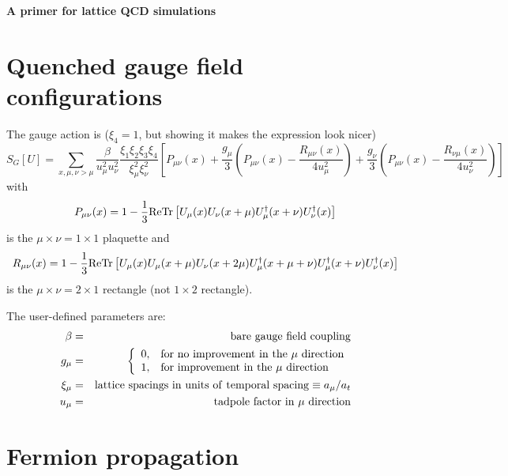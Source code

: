 \documentclass[12pt]{article}
\begin{document}
\begin{center}
{\bf A primer for lattice QCD simulations}
\end{center}

\section{Quenched gauge field configurations}

The gauge action is ($\xi_4=1$, but showing it makes the expression look nicer)
\[
S_G[U] = \sum_{x,\mu,\nu>\mu}\frac{\beta}{u_\mu^2u_\nu^2}
         \frac{\xi_1\xi_2\xi_3\xi_4}{\xi_\mu^2\xi_\nu^2}
         \left[P_{\mu\nu}(x)
         +\frac{g_\mu}{3}\left(P_{\mu\nu}(x)
         -\frac{R_{\mu\nu}(x)}{4u_\mu^2}\right)
         +\frac{g_\nu}{3}\left(P_{\mu\nu}(x)
         -\frac{R_{\nu\mu}(x)}{4u_\nu^2}\right)
\right]
\]
with
\[
P_{\mu\nu}(x) = 1-\frac{1}{3}{\rm ReTr}\left[U_\mu(x)U_\nu(x+\mu)
                U_\mu^\dagger(x+\nu)U_\nu^\dagger(x)\right]
\]
is the $\mu\times\nu = 1\times1$ plaquette and
\[
R_{\mu\nu}(x) = 1-\frac{1}{3}{\rm ReTr}\left[U_\mu(x)U_\mu(x+\mu)U_\nu(x+2\mu)
                U_\mu^\dagger(x+\mu+\nu)U_\mu^\dagger(x+\nu)U_\nu^\dagger(x)
                \right]
\]
is the $\mu\times\nu = 2\times1$ rectangle (not $1\times2$ rectangle).

The user-defined parameters are:
\begin{eqnarray}
\beta &=& {\rm bare~gauge~field~coupling} \nonumber \\
g_\mu &=& \left\{\begin{array}{ll}
 0, & {\rm for~no~improvement~in~the~}\mu{\rm ~direction} \\
 1, & {\rm for~improvement~in~the~}\mu{\rm ~direction}
 \end{array}\right. \nonumber \\
\xi_\mu &=& {\rm lattice~spacings~in~units~of~temporal~spacing}
            \equiv a_\mu/a_t \nonumber \\
u_\mu &=& {\rm tadpole~factor~in~}\mu{\rm ~direction} \nonumber
\end{eqnarray}

\section{Fermion propagation}
\end{document}
